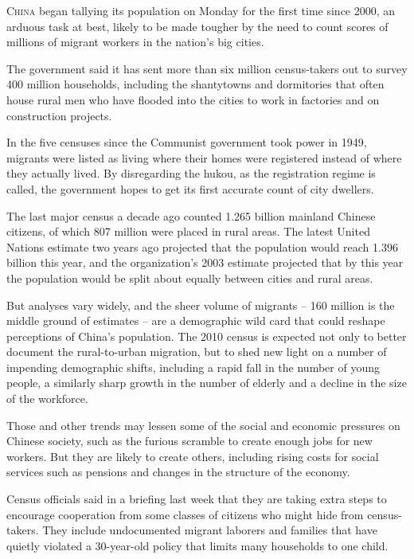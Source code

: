 ﻿\documentclass[12pt]{article}
\begin{document}
\lettrine{C}{hina} began tallying its population on Monday for the first
time since 2000, an arduous task at best, likely to be made tougher by the need to count scores of
millions of migrant workers in the nation's big cities.

The government said it has sent more than six million census-takers out to survey 400 million
households, including the shantytowns and dormitories that often house rural men who have flooded
into the cities to work in factories and on construction projects.

In the five censuses since the Communist government took power in 1949, migrants were listed as
living where their homes were registered instead of where they actually lived. By disregarding the
hukou, as the registration regime is called, the government hopes to get its first accurate count of
city dwellers.

The last major census a decade ago counted 1.265 billion mainland Chinese citizens, of which 807
million were placed in rural areas. The latest United Nations estimate two years ago projected that
the population would reach 1.396 billion this year, and the organization's 2003 estimate projected
that by this year the population would be split about equally between cities and rural areas.

But analyses vary widely, and the sheer volume of migrants -- 160 million is the middle ground of
estimates -- are a demographic wild card that could reshape perceptions of China's population. The
2010 census is expected not only to better document the rural-to-urban migration, but to shed new
light on a number of impending demographic shifts, including a rapid fall in the number of young
people, a similarly sharp growth in the number of elderly and a decline in the size of the
workforce.

Those and other trends may lessen some of the social and economic pressures on Chinese society, such
as the furious scramble to create enough jobs for new workers. But they are likely to create others,
including rising costs for social services such as pensions and changes in the structure of the
economy.

Census officials said in a briefing last week that they are taking extra steps to encourage
cooperation from some classes of citizens who might hide from census-takers. They include
undocumented migrant laborers and families that have quietly violated a 30-year-old policy that
limits many households to one child.
\end{document}
